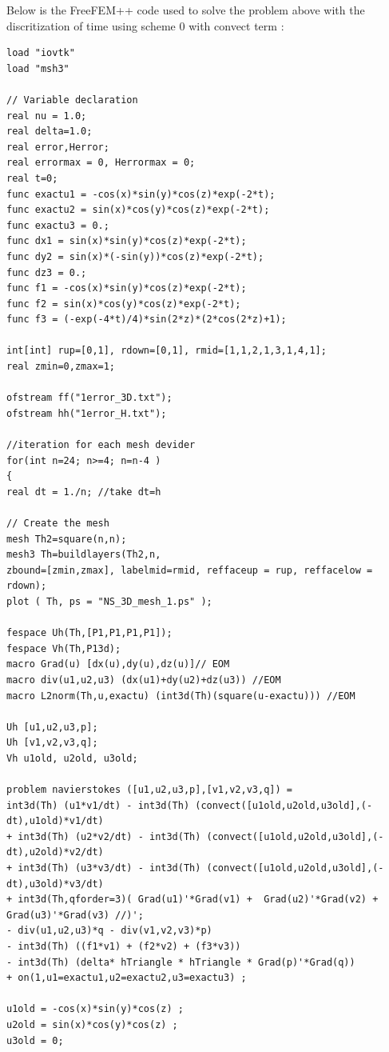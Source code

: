 \documentclass[a4paper,10pt]{article}
\begin{document}
\newpage
Below is the FreeFEM++ code used to solve the problem above with the discritization of time using scheme $ 0 $ with convect term :
\begin{lstlisting}
load "iovtk"
load "msh3"

// Variable declaration
real nu = 1.0;
real delta=1.0;
real error,Herror;
real errormax = 0, Herrormax = 0;
real t=0;
func exactu1 = -cos(x)*sin(y)*cos(z)*exp(-2*t);
func exactu2 = sin(x)*cos(y)*cos(z)*exp(-2*t);
func exactu3 = 0.;
func dx1 = sin(x)*sin(y)*cos(z)*exp(-2*t);
func dy2 = sin(x)*(-sin(y))*cos(z)*exp(-2*t);
func dz3 = 0.;
func f1 = -cos(x)*sin(y)*cos(z)*exp(-2*t);
func f2 = sin(x)*cos(y)*cos(z)*exp(-2*t);
func f3 = (-exp(-4*t)/4)*sin(2*z)*(2*cos(2*z)+1);

int[int] rup=[0,1], rdown=[0,1], rmid=[1,1,2,1,3,1,4,1];
real zmin=0,zmax=1;

ofstream ff("1error_3D.txt");
ofstream hh("1error_H.txt");

//iteration for each mesh devider
for(int n=24; n>=4; n=n-4 )
{
real dt = 1./n; //take dt=h

// Create the mesh
mesh Th2=square(n,n);
mesh3 Th=buildlayers(Th2,n,
zbound=[zmin,zmax], labelmid=rmid, reffaceup = rup, reffacelow = rdown);
plot ( Th, ps = "NS_3D_mesh_1.ps" );

fespace Uh(Th,[P1,P1,P1,P1]);
fespace Vh(Th,P13d);
macro Grad(u) [dx(u),dy(u),dz(u)]// EOM
macro div(u1,u2,u3) (dx(u1)+dy(u2)+dz(u3)) //EOM
macro L2norm(Th,u,exactu) (int3d(Th)(square(u-exactu))) //EOM

Uh [u1,u2,u3,p];
Uh [v1,v2,v3,q];
Vh u1old, u2old, u3old;

problem navierstokes ([u1,u2,u3,p],[v1,v2,v3,q]) = 
int3d(Th) (u1*v1/dt) - int3d(Th) (convect([u1old,u2old,u3old],(-dt),u1old)*v1/dt)
+ int3d(Th) (u2*v2/dt) - int3d(Th) (convect([u1old,u2old,u3old],(-dt),u2old)*v2/dt)
+ int3d(Th) (u3*v3/dt) - int3d(Th) (convect([u1old,u2old,u3old],(-dt),u3old)*v3/dt)
+ int3d(Th,qforder=3)( Grad(u1)'*Grad(v1) +  Grad(u2)'*Grad(v2) +  Grad(u3)'*Grad(v3) //)';
- div(u1,u2,u3)*q - div(v1,v2,v3)*p)
- int3d(Th) ((f1*v1) + (f2*v2) + (f3*v3))
- int3d(Th) (delta* hTriangle * hTriangle * Grad(p)'*Grad(q))
+ on(1,u1=exactu1,u2=exactu2,u3=exactu3) ;

u1old = -cos(x)*sin(y)*cos(z) ;
u2old = sin(x)*cos(y)*cos(z) ;
u3old = 0;


\end{lstlisting}
\end{document}
